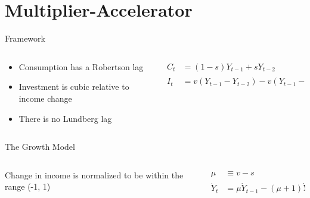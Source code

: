 \documentclass{beamer}
\begin{document}
\section*{Multiplier-Accelerator}
\begin{frame}{Framework}
	\begin{columns}
	\begin{column}{0.5\textwidth}
		\begin{itemize}
			\item Consumption has a Robertson lag
			\item Investment is cubic relative to income change
			\item There is no Lundberg lag
		\end{itemize}
	\end{column}
	\begin{column}{0.5\textwidth}
		\begin{align*}
			C_t &= (1-s)Y_{t-1} + sY_{t-2}\\
			I_t &= v(Y_{t-1}-Y_{t-2})-v(Y_{t-1}-Y_{t-2})^3
		\end{align*}
	\end{column}
	\end{columns}
\end{frame}
\begin{frame}{The Growth Model}
	\begin{columns}
	\begin{column}{0.5\textwidth}
		Change in income is normalized\autocite{Puu2003} to be within the range (-1, 1)
	\end{column}
	\begin{column}{0.5\textwidth}
		\begin{align*}
			\mu &\equiv v-s\\
			\dot Y_t &= \mu\dot Y_{t-1}-(\mu+1)\dot Y_{t-1}^3
		\end{align*}
	\end{column}
	\end{columns}
\end{frame}
\end{document}
